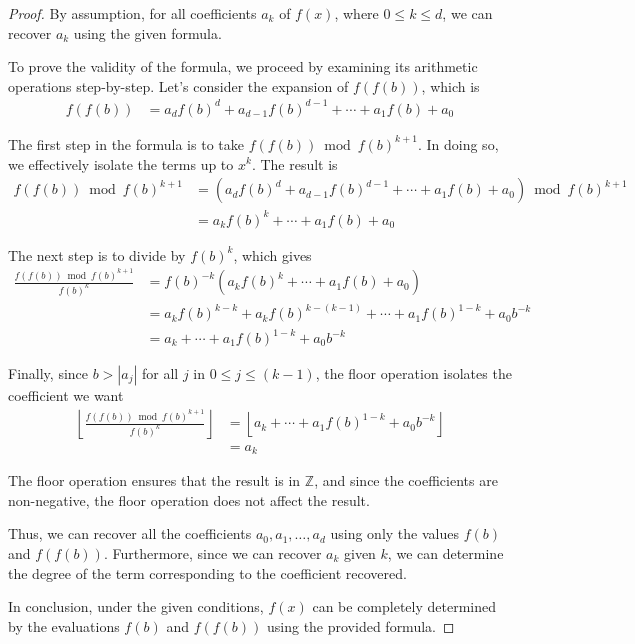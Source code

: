 \documentclass[11pt,reqno]{article}
\theoremstyle{plain}
\theoremstyle{definition}
\newcommand{\floor}[1]{\left\lfloor #1 \right\rfloor}
\begin{document}
\begin{proof}
By assumption, for all coefficients $a_k$ of $f(x)$, where $0 \leq k \leq d$, we can recover $a_k$ using the given formula.

To prove the validity of the formula, we proceed by examining its arithmetic operations step-by-step. Let's consider the expansion of $f(f(b))$, which is
\begin{align*}
f(f(b)) &= a_d f(b)^d + a_{d-1} f(b)^{d-1} + \cdots + a_1 f(b) + a_0
\end{align*}

The first step in the formula is to take $f(f(b)) \bmod{f(b)^{k + 1}}$. In doing so, we effectively isolate the terms up to $x^k$. The result is
\begin{align*}
f(f(b)) \bmod{f(b)^{k + 1}} &= (a_d f(b)^d + a_{d-1} f(b)^{d-1} + \cdots + a_1 f(b) + a_0) \bmod{f(b)^{k + 1}} \\
&= a_k f(b)^k + \cdots + a_1 f(b) + a_0 
\end{align*}

The next step is to divide by $f(b)^k$, which gives
\begin{align*}
\frac{f(f(b))  \bmod{f(b)^{k + 1}}}{f(b)^{k}} &= f(b)^{-k} (a_k f(b)^k + \cdots + a_1 f(b) + a_0) \\
&= a_k f(b)^{k-k} + a_k f(b)^{k-(k-1)} + \cdots + a_1 f(b)^{1-k} + a_0 b^{-k} \\
&= a_k + \cdots + a_1 f(b)^{1-k} + a_0 b^{-k}
\end{align*}

Finally, since $b > |a_j|$ for all $j$ in $0 \leq j \leq (k-1)$, the floor operation isolates the coefficient we want
\begin{align*}
\floor{\frac{f(f(b)) \bmod{f(b)^{k + 1}}}{f(b)^{k}}}
&= \floor{a_k + \cdots + a_1 f(b)^{1-k} + a_0 b^{-k}} \\
&= a_k
\end{align*}

The floor operation ensures that the result is in $\mathbb{Z}$, and since the coefficients are non-negative, the floor operation does not affect the result.

Thus, we can recover all the coefficients $a_0, a_1, \ldots, a_d$ using only the values $f(b)$ and $f(f(b))$. Furthermore, since we can recover $a_k$ given $k$, we can determine the degree of the term corresponding to the coefficient recovered.

In conclusion, under the given conditions, $f(x)$ can be completely determined by the evaluations $f(b)$ and $f(f(b))$ using the provided formula.
\end{proof}
\end{document}
